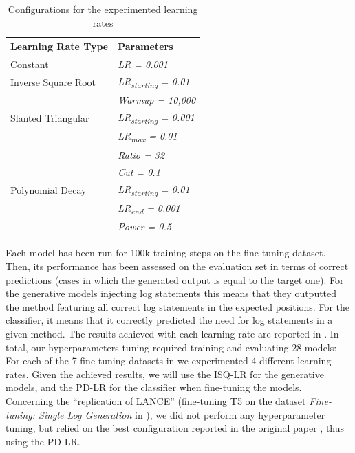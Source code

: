 \begin{table}[h]
	\centering
	\caption{Configurations for the experimented learning rates}
	\begin{tabular}{ll}
		\hline
		\textbf{Learning Rate Type} & \textbf{Parameters}               \\ \hline
		Constant                     & \textit{LR = 0.001}               \\
		Inverse Square Root         & \textit{LR\textsubscript{starting} = 0.01}  \\
		& \textit{Warmup = 10,000}          \\
		Slanted Triangular          & \textit{LR\textsubscript{starting} = 0.001} \\
		& \textit{LR\textsubscript{max} = 0.01}       \\
		& \textit{Ratio = 32}               \\
		& \textit{Cut = 0.1}                \\
		Polynomial Decay            & \textit{LR\textsubscript{starting} = 0.01}  \\
		& \textit{LR\textsubscript{end} = 0.001}      \\
		& \textit{Power = 0.5}              \\ \hline
	\end{tabular}
	\label{tab:learning-rates}
\end{table}

Each model has been run for 100k training steps on the fine-tuning dataset. Then, its performance has been assessed on the evaluation set in terms of correct predictions (\ie cases in which the generated output is equal to the target one). For the generative models injecting log statements this means that they outputted the \java method featuring all correct log statements in the expected positions. For the classifier, it means that it correctly predicted the need for log statements in a given \java method. The results achieved with each learning rate are reported in . In total, our hyperparameters tuning required training and evaluating 28 models: For each of the 7 fine-tuning datasets in  we experimented 4 different learning rates. Given the achieved results, we will use the ISQ-LR for the generative models, and the PD-LR for the classifier when fine-tuning the models. Concerning the ``replication of LANCE'' (\ie fine-tuning T5 on the dataset \emph{Fine-tuning: Single Log Generation} in ), we did not perform any hyperparameter tuning, but relied on the best configuration reported in the original paper \cite{mastropaolo2021studying}, thus using the PD-LR.

